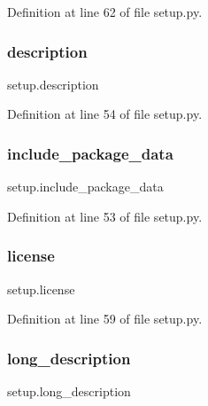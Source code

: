 Definition at line 62 of file setup.\+py.

\hypertarget{namespacesetup_aedf461ec52a946bda975938ba0b93ec0}{}\label{namespacesetup_aedf461ec52a946bda975938ba0b93ec0} 
\subsubsection{\texorpdfstring{description}{description}}
{\footnotesize\ttfamily setup.\+description}



Definition at line 54 of file setup.\+py.

\hypertarget{namespacesetup_a35139105b25ef46629d31888bad595d8}{}\label{namespacesetup_a35139105b25ef46629d31888bad595d8} 
\subsubsection{\texorpdfstring{include\+\_\+package\+\_\+data}{include\_package\_data}}
{\footnotesize\ttfamily setup.\+include\+\_\+package\+\_\+data}



Definition at line 53 of file setup.\+py.

\hypertarget{namespacesetup_a8ed6f50a28bd6a8794f8e1153baa6de9}{}\label{namespacesetup_a8ed6f50a28bd6a8794f8e1153baa6de9} 
\subsubsection{\texorpdfstring{license}{license}}
{\footnotesize\ttfamily setup.\+license}



Definition at line 59 of file setup.\+py.

\hypertarget{namespacesetup_a4cda9dbfb952875376a0749fe08a5bde}{}\label{namespacesetup_a4cda9dbfb952875376a0749fe08a5bde} 
\subsubsection{\texorpdfstring{long\+\_\+description}{long\_description}}
{\footnotesize\ttfamily setup.\+long\+\_\+description}



